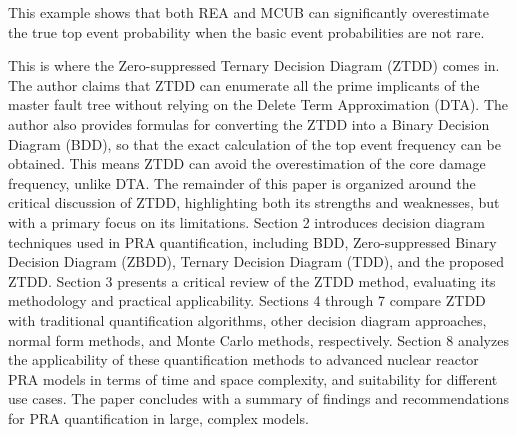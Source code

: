 This example shows that both REA and MCUB can significantly overestimate the true top event probability when the basic event probabilities are not rare.

This is where the Zero-suppressed Ternary Decision Diagram (ZTDD) comes in. The author claims that ZTDD can enumerate all the prime implicants of the master fault tree without relying on the Delete Term Approximation (DTA). The author also provides formulas for converting the ZTDD into a Binary Decision Diagram (BDD), so that the exact calculation of the top event frequency can be obtained. This means ZTDD can avoid the overestimation of the core damage frequency, unlike DTA. The remainder of this paper is organized around the critical discussion of ZTDD, highlighting both its strengths and weaknesses, but with a primary focus on its limitations. Section 2 introduces decision diagram techniques used in PRA quantification, including BDD, Zero-suppressed Binary Decision Diagram (ZBDD), Ternary Decision Diagram (TDD), and the proposed ZTDD. Section 3 presents a critical review of the ZTDD method, evaluating its methodology and practical applicability. Sections 4 through 7 compare ZTDD with traditional quantification algorithms, other decision diagram approaches, normal form methods, and Monte Carlo methods, respectively. Section 8 analyzes the applicability of these quantification methods to advanced nuclear reactor PRA models in terms of time and space complexity, and suitability for different use cases. The paper concludes with a summary of findings and recommendations for PRA quantification in large, complex models.